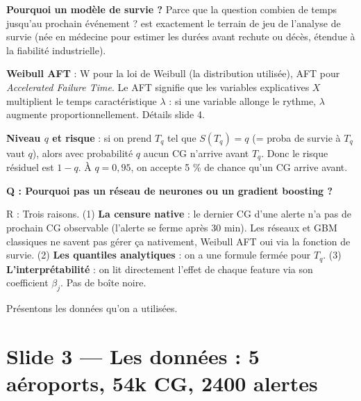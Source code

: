 \documentclass[11pt,a4paper]{article}
\begin{document}
\begin{compr}
\textbf{Pourquoi un modèle de survie ?} Parce que la question \og combien de temps jusqu'au
prochain événement ? \fg{} est exactement le terrain de jeu de l'analyse de survie (née en
médecine pour estimer les durées avant rechute ou décès, étendue à la fiabilité industrielle).

\textbf{Weibull AFT} : \og W \fg{} pour la loi de Weibull (la distribution utilisée),
\og AFT \fg{} pour \textit{Accelerated Failure Time}. Le AFT signifie que les variables
explicatives $X$ multiplient le temps caractéristique $\lambda$ : si une variable allonge
le rythme, $\lambda$ augmente proportionnellement. Détails slide 4.

\textbf{Niveau $q$ et risque} : si on prend $T_q$ tel que $S(T_q) = q$ (= proba de survie à $T_q$
vaut $q$), alors avec probabilité $q$ aucun CG n'arrive avant $T_q$. Donc le \og risque \fg{}
résiduel est $1 - q$. À $q = 0{,}95$, on accepte 5 \% de chance qu'un CG arrive avant.
\end{compr}

\begin{piege}
\textbf{Q : Pourquoi pas un réseau de neurones ou un gradient boosting ?}

R : Trois raisons. (1) \textbf{La censure native} : le dernier CG d'une alerte n'a pas de
prochain CG observable (l'alerte se ferme après 30 min). Les réseaux et GBM classiques ne
savent pas gérer ça nativement, Weibull AFT oui via la fonction de survie. (2) \textbf{Les
quantiles analytiques} : on a une formule fermée pour $T_q$. (3) \textbf{L'interprétabilité} :
on lit directement l'effet de chaque feature via son coefficient $\beta_j$. Pas de
boîte noire.
\end{piege}

\begin{transit}
\og Présentons les données qu'on a utilisées. \fg{}
\end{transit}

\section{Slide 3 — Les données : 5 aéroports, 54k CG, 2400 alertes}
\end{document}

